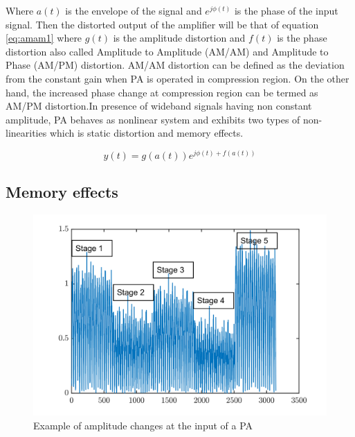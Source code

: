 Where $a(t)$ is the envelope of the signal and $e^{j\phi(t)}$ is the phase of the input signal. Then the distorted output of the amplifier will be that of equation \ref{eq:amam1} where $g(t)$ is the amplitude distortion and $f(t)$ is the phase distortion also called Amplitude to Amplitude (AM/AM) and Amplitude to Phase (AM/PM) distortion. AM/AM distortion can be defined as the deviation from the constant gain when PA is
operated in compression region. On the other hand, the increased phase change at compression
region can be termed as AM/PM distortion.In presence of wideband signals having non constant amplitude, PA behaves as nonlinear system and exhibits two types of non-linearities which is static distortion and memory effects.  

\begin{equation}\label{eq:amam2}
y(t) = g(a(t))e^{j\phi(t)+f(a(t))}
\end{equation}

\subsection{Memory effects}

\begin{figure}[H]
\centering 
\includegraphics[scale = 0.7]{figures/ch1/amplitude.png}
\caption{Example of amplitude changes at the input of a PA }
\label{fig:mem_amp}
\end{figure}


